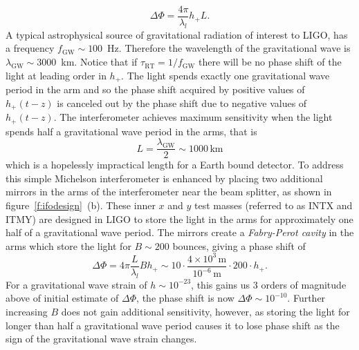 \begin{equation}
\Delta \Phi = \frac{4\pi}{\lambda_l} h_{+} L.
\end{equation}
A typical astrophysical source of gravitational radiation of interest to LIGO,
has a frequency $f_\mathrm{GW} \sim 100$~Hz. Therefore the wavelength of the
gravitational wave is $\lambda_\mathrm{GW} \sim 3000$~km. Notice that if
$\tau_\mathrm{RT} = 1 / f_\mathrm{GW}$ there will be no phase shift of the
light at leading order in $h_+$. The light spends exactly one gravitational
wave period in the arm and so the phase shift acquired by positive values of
$h_+(t-z)$ is canceled out by the phase shift due to negative values of
$h_+(t-z)$. The interferometer achieves maximum sensitivity when the light
spends half a gravitational wave period in the arms, that is
\begin{equation}
L = \frac{\lambda_\mathrm{GW}}{2} \sim 1000\,\mathrm{km}
\end{equation}
which is a hopelessly impractical length for a Earth bound detector. To
address this simple Michelson interferometer is enhanced by placing two
additional mirrors in the arms of the interferometer near the beam splitter,
as shown in figure~\ref{f:ifodesign}~(b). These inner $x$ and $y$ test masses
(referred to as INTX and ITMY) are designed in LIGO to store the light in the
arms for approximately one half of a gravitational wave period.  The mirrors
create a \emph{Fabry-Perot cavity} in the arms which store the light for $B
\sim 200$ bounces, giving a phase shift of
\begin{equation}
\Delta \Phi = 4\pi \frac{L}{\lambda_l} B h_{+} \sim 
10 \cdot \frac{4 \times 10^3\,\mathrm{m}}{10^{-6}\,\mathrm{m}} \cdot 200 \cdot
h_+.
\end{equation}
For a gravitational wave strain of $h \sim 10^{-23}$, this gains us 3 orders
of magnitude above of initial estimate of $\Delta \Phi$, the phase shift is
now $\Delta \Phi \sim 10^{-10}$.  Further increasing $B$ does not gain
additional sensitivity, however, as storing the light for longer than half a
gravitational wave period causes it to lose phase shift as the sign of the
gravitational wave strain changes.

